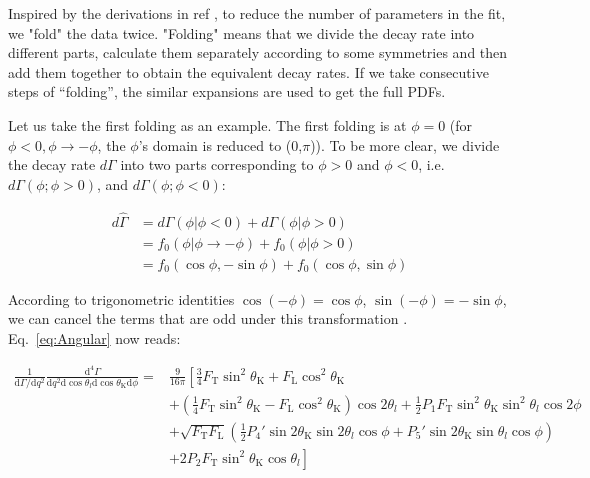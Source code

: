 Inspired by the derivations in ref \cite{LHCb2}\cite{Matias2012}, to
reduce the number of parameters in the fit, we "fold" the data
twice. "Folding" means that we divide the decay rate into different
parts, calculate them separately according to some symmetries and then
add them together to obtain the equivalent decay rates. If we take
consecutive steps of ``folding'', the similar expansions are used to
get the full PDFs.

Let us take the first folding as an example.
The first folding is at
$ \phi=0$ (for $\phi<0,\phi\rightarrow-\phi$, the $\phi$'s domain is reduced to
    (0,$\pi$)). To be more clear, we divide the decay rate $d\Gamma$
into two parts corresponding to $\phi>0$ and $\phi<0$,
i.e. $d\Gamma(\phi;\phi>0)$, and $d\Gamma(\phi;\phi<0)$:

\begin{equation} \label{eq:folding}
    \begin{split}
        d\hat{\Gamma} &= d\Gamma(\phi|\phi<0) + d\Gamma(\phi|\phi>0) \\
        & = f_0(\phi|\phi\rightarrow-\phi) + f_0(\phi|\phi>0) \\
        & = f_0(\cos\phi, -\sin\phi) + f_0(\cos\phi, \sin\phi)
    \end{split}
\end{equation}


According to trigonometric identities $\cos(-\phi) = \cos\phi $,
$\sin(-\phi) = -\sin\phi $, we can cancel the terms 
that are odd under this transformation
. Eq.~\ref{eq:Angular} now reads:

\begin{equation} \label{eq:fold1}
    \begin{split}
        \frac{1}{\mathrm{d}\Gamma/\mathrm{d}q^2}\frac{\mathrm{d}^4\Gamma}{\mathrm{d}q^2 \mathrm{d}\cos\theta_l \mathrm{d}\cos\theta_\mathrm{K} \mathrm{d}\phi} =&\frac{9}{16\pi}\left[\frac{3}{4}F_\mathrm{T}\sin^2\theta_\mathrm{K} + F_\mathrm{L}\cos^2\theta_\mathrm{K} \right.\\
            &\left.+(\frac{1}{4}F_\mathrm{T}\sin^2\theta_\mathrm{K}-F_\mathrm{L}\cos^2\theta_\mathrm{K})\cos2\theta_l+\frac{1}{2}P_1F_\mathrm{T}\sin^2\theta_\mathrm{K}\sin^2\theta_l\cos 2\phi \right.\\
            &+\sqrt{F_\mathrm{T}F_\mathrm{L}}(\frac{1}{2}P_4'\sin2\theta_\mathrm{K}\sin2\theta_l\cos\phi+P_5'\sin2\theta_\mathrm{K}\sin\theta_l\cos\phi )\\
            &\left.+2P_2F_\mathrm{T}\sin^2\theta_\mathrm{K}\cos\theta_l \right]
    \end{split}
\end{equation}

